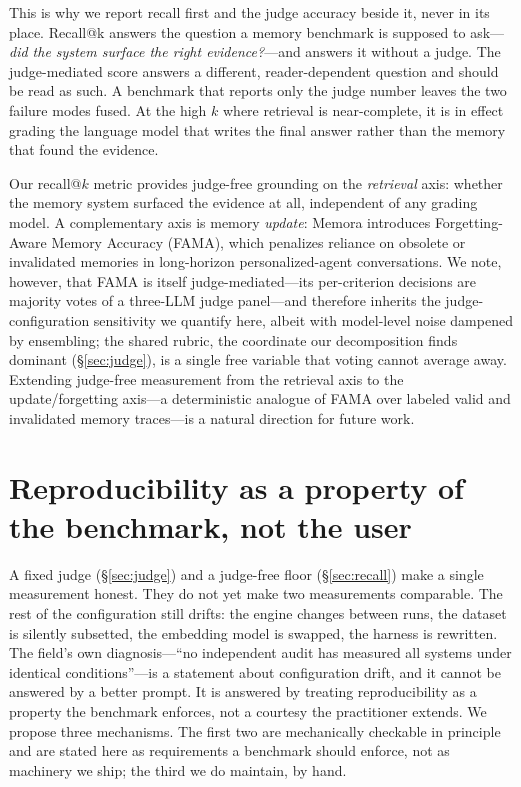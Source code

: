 \documentclass[11pt]{article}
\begin{document}
This is why we report recall first and the judge accuracy beside it, never in its place. Recall@k answers the question a memory benchmark is supposed to ask---\emph{did the system surface the right evidence?}---and answers it without a judge. The judge-mediated score answers a different, reader-dependent question and should be read as such. A benchmark that reports only the judge number leaves the two failure modes fused. At the high $k$ where retrieval is near-complete, it is in effect grading the language model that writes the final answer rather than the memory that found the evidence.

Our recall@$k$ metric provides judge-free grounding on the \emph{retrieval} axis: whether the memory system surfaced the evidence at all, independent of any grading model. A complementary axis is memory \emph{update}: Memora \citep{uddin2026memora} introduces Forgetting-Aware Memory Accuracy (FAMA), which penalizes reliance on obsolete or invalidated memories in long-horizon personalized-agent conversations. We note, however, that FAMA is itself judge-mediated---its per-criterion decisions are majority votes of a three-LLM judge panel---and therefore inherits the judge-configuration sensitivity we quantify here, albeit with model-level noise dampened by ensembling; the shared rubric, the coordinate our decomposition finds dominant (\S\ref{sec:judge}), is a single free variable that voting cannot average away. Extending judge-free measurement from the retrieval axis to the update/forgetting axis---a deterministic analogue of FAMA over labeled valid and invalidated memory traces---is a natural direction for future work.

\section{Reproducibility as a property of the benchmark, not the user}\label{sec:repro}

A fixed judge (\S\ref{sec:judge}) and a judge-free floor (\S\ref{sec:recall}) make a single measurement honest. They do not yet make two measurements comparable. The rest of the configuration still drifts: the engine changes between runs, the dataset is silently subsetted, the embedding model is swapped, the harness is rewritten. The field's own diagnosis---``no independent audit has measured all systems under identical conditions''\citep{synthius}---is a statement about configuration drift, and it cannot be answered by a better prompt. It is answered by treating reproducibility as a property the benchmark enforces, not a courtesy the practitioner extends. We propose three mechanisms. The first two are mechanically checkable in principle and are stated here as requirements a benchmark should enforce, not as machinery we ship; the third we do maintain, by hand.
\end{document}
